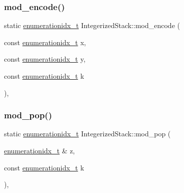 \mbox{\label{class_integerized_stack_add34247b848e6601cbd55cccde98232a}} 
\subsubsection{\texorpdfstring{mod\+\_\+encode()}{mod\_encode()}}
{\footnotesize\ttfamily static \hyperlink{_integerized_stack_8h_a9fe2bbca873b046b2bd276fc6856bb88}{enumerationidx\+\_\+t} Integerized\+Stack\+::mod\+\_\+encode (\begin{DoxyParamCaption}\item[{const \hyperlink{_integerized_stack_8h_a9fe2bbca873b046b2bd276fc6856bb88}{enumerationidx\+\_\+t}}]{x,  }\item[{const \hyperlink{_integerized_stack_8h_a9fe2bbca873b046b2bd276fc6856bb88}{enumerationidx\+\_\+t}}]{y,  }\item[{const \hyperlink{_integerized_stack_8h_a9fe2bbca873b046b2bd276fc6856bb88}{enumerationidx\+\_\+t}}]{k }\end{DoxyParamCaption})\hspace{0.3cm}{\ttfamily [inline]}, {\ttfamily [static]}}

\mbox{\label{class_integerized_stack_a07669571cd083803edb5a863c3c5419e}} 
\subsubsection{\texorpdfstring{mod\+\_\+pop()}{mod\_pop()}}
{\footnotesize\ttfamily static \hyperlink{_integerized_stack_8h_a9fe2bbca873b046b2bd276fc6856bb88}{enumerationidx\+\_\+t} Integerized\+Stack\+::mod\+\_\+pop (\begin{DoxyParamCaption}\item[{\hyperlink{_integerized_stack_8h_a9fe2bbca873b046b2bd276fc6856bb88}{enumerationidx\+\_\+t} \&}]{z,  }\item[{const \hyperlink{_integerized_stack_8h_a9fe2bbca873b046b2bd276fc6856bb88}{enumerationidx\+\_\+t}}]{k }\end{DoxyParamCaption})\hspace{0.3cm}{\ttfamily [inline]}, {\ttfamily [static]}}

